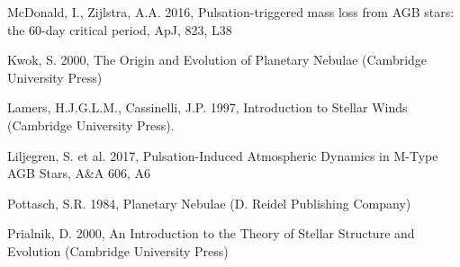 \documentclass[a4paper,11pt,twocolumn]{article}
\begin{document}
\begin{thebibliography}{9}

    McDonald, I., Zijlstra, A.A. 2016, Pulsation-triggered mass loss from AGB stars: the 60-day critical period, ApJ, 823, L38 




    Kwok, S. 2000, The Origin and Evolution of Planetary Nebulae (Cambridge University Press)


    Lamers, H.J.G.L.M., Cassinelli, J.P. 1997, Introduction to Stellar Winds (Cambridge University Press). 

    Liljegren, S. et al. 2017, Pulsation-Induced Atmospheric Dynamics in M-Type AGB Stars, A\&A 606, A6 


    Pottasch, S.R. 1984, Planetary Nebulae (D. Reidel Publishing Company)

    Prialnik, D. 2000, An Introduction to the Theory of Stellar Structure and Evolution (Cambridge University Press)


\end{thebibliography}
\end{document}
